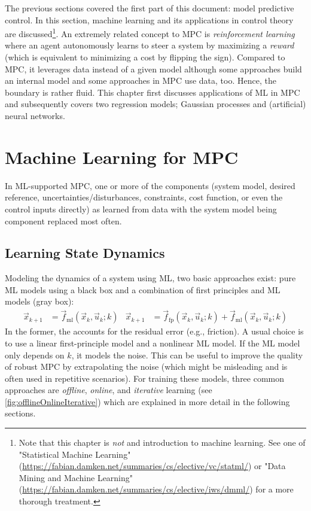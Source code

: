 	The previous sections covered the first part of this document: model predictive control. In this section, machine learning and its applications in control theory are discussed\footnote{Note that this chapter is \emph{not} and introduction to machine learning. See one of "Statistical Machine Learning" (\url{https://fabian.damken.net/summaries/cs/elective/vc/statml/}) or "Data Mining and Machine Learning" (\url{https://fabian.damken.net/summaries/cs/elective/iws/dmml/}) for a more thorough treatment.}. An extremely related concept to MPC is \emph{reinforcement learning} where an agent autonomously learns to steer a system by maximizing a \emph{reward} (which is equivalent to minimizing a cost by flipping the sign). Compared to MPC, it leverages data instead of a given model although some approaches build an internal model and some approaches in MPC use data, too. Hence, the boundary is rather fluid. This chapter first discusses applications of ML in MPC and subsequently covers two regression models; Gaussian processes and (artificial) neural networks.

	\section{Machine Learning for MPC}
		In ML-supported MPC, one or more of the components (system model, desired reference, uncertainties/disturbances, constraints, cost function, or even the control inputs directly) as learned from data with the system model being component replaced most often.

		\label{10.3, 10.4}

		\subsection{Learning State Dynamics}
			Modeling the dynamics of a system using ML, two basic approaches exist: pure ML models using a black box and a combination of first principles and ML models (gray box):
			\begin{align}
				\vec{x}_{k + 1} & = \vec{f}_\mathrm{ml}(\vec{x}_k, \vec{u}_k; k)                                                &
				\vec{x}_{k + 1} & = \vec{f}_\mathrm{fp}(\vec{x}_k, \vec{u}_k; k) + \vec{f}_\mathrm{ml}(\vec{x}_k, \vec{u}_k; k)
			\end{align}
			In the former, the accounts for the residual error (e.g., friction). A usual choice is to use a linear first-principle model and a nonlinear ML model. If the ML model only depends on \(k\), it models the noise. This can be useful to improve the quality of robust MPC by extrapolating the noise (which might be misleading and is often used in repetitive scenarios). For training these models, three common approaches are \emph{offline}, \emph{online}, and \emph{iterative} learning (see \autoref{fig:offlineOnlineIterative}) which are explained in more detail in the following sections.

